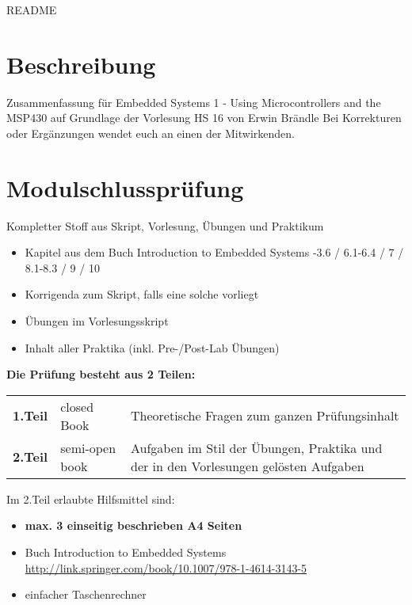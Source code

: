 \thispagestyle{empty}
\setcounter{page}{0} %
\vspace*{-2cm}
{\huge README }
{\scriptsize
\section*{Beschreibung}
Zusammenfassung für Embedded Systems 1 - Using Microcontrollers and the MSP430 auf Grundlage der Vorlesung HS 16 von Erwin Brändle  \newline
Bei Korrekturen oder Ergänzungen wendet euch an einen der Mitwirkenden.


\section*{Modulschlussprüfung}
Kompletter Stoff aus Skript, Vorlesung, Übungen und Praktikum

    \begin{itemize}
        \item Kapitel aus dem Buch Introduction to Embedded Systems 
	        -3.6 / 6.1-6.4 / 7 / 8.1-8.3 / 9 / 10 
	     \item Korrigenda zum Skript, falls eine solche vorliegt  
	     \item Übungen im Vorlesungsskript  
	     \item Inhalt aller Praktika (inkl. Pre-/Post-Lab Übungen)
    \end{itemize}

\textbf{Die Prüfung besteht aus 2 Teilen:}\newline
\begin{tabular}{p{1.5cm} p{3cm} p{10cm}}
    \textbf{ 1.Teil}   & closed Book & Theoretische Fragen zum ganzen Prüfungsinhalt \\ 
    \textbf{ 2.Teil}   & semi-open book & Aufgaben im Stil der Übungen, Praktika und der in den Vorlesungen gelösten Aufgaben \\ 
\end{tabular} \newline

Im 2.Teil erlaubte Hilfsmittel sind:
\begin{itemize}
	\item \textbf{max. 3 einseitig beschrieben A4 Seiten}
	\item Buch Introduction to Embedded Systems
    \subitem \url{http://link.springer.com/book/10.1007/978-1-4614-3143-5}
	\item einfacher Taschenrechner
\end{itemize}

}
